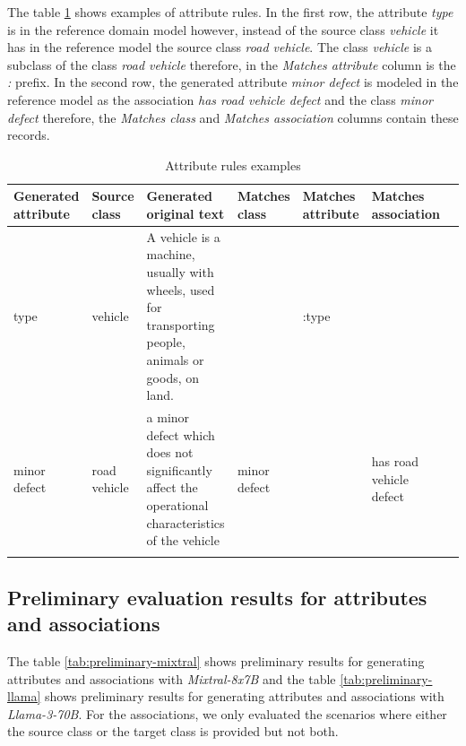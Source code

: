 The table \ref{tab:attribute-rules} shows examples of attribute rules. In the first row, the attribute \textit{type} is in the reference domain model however, instead of the source class \textit{vehicle} it has in the reference model the source class \textit{road vehicle}. The class \textit{vehicle} is a subclass of the class \textit{road vehicle} therefore, in the \textit{Matches attribute} column is the \textit{:} prefix. In the second row, the generated attribute \textit{minor defect} is modeled in the reference model as the association \textit{has road vehicle defect} and the class \textit{minor defect} therefore, the \textit{Matches class} and \textit{Matches association} columns contain these records.


\begin{table}[!h]
    \scriptsize
    \centering
    \setlength{\tabcolsep}{0.5em}
\begin{tabular}{@{}l>{\raggedright\arraybackslash}p{}>{\raggedright\arraybackslash}p{}>{\raggedright\arraybackslash}p{}>{\raggedright\arraybackslash}p{}>{\raggedright\arraybackslash}p{}>{\raggedright\arraybackslash}p{}@{}}
         Generated attribute & Source class & Generated original text & Matches class & Matches attribute & Matches association \\
    \toprule
    \addlinespace

type & vehicle & A vehicle is a machine, usually with wheels, used for transporting people, animals or goods, on land. & & :type & \\

\addlinespace

minor defect & road vehicle &  a minor defect which does not significantly affect the operational characteristics of the vehicle & minor defect & & has road vehicle defect \\

	\addlinespace
	\bottomrule
	\addlinespace
	\end{tabular}
	\caption{Attribute rules examples}
	\label{tab:attribute-rules}
\end{table}


\subsection{Preliminary evaluation results for attributes and associations}
\label{sec:preliminary_attributes_associations}

The table \ref{tab:preliminary-mixtral} shows preliminary results for generating attributes and associations with \emph{Mixtral-8x7B} and the table \ref{tab:preliminary-llama} shows preliminary results for generating attributes and associations with \emph{Llama-3-70B}. For the associations, we only evaluated the scenarios where either the source class or the target class is provided but not both.


